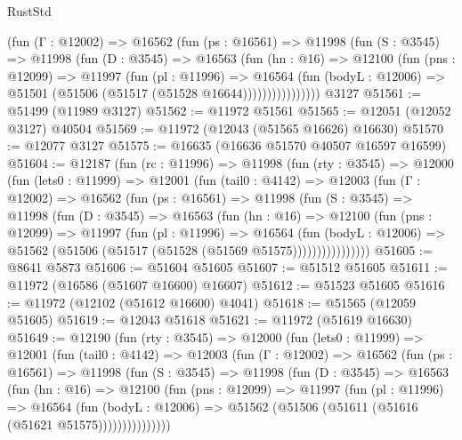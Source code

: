 \begin{lexlean}{RustStd}
\begin{coremodule}
              (fun (Γ : @12002) =>
              @16562
                (fun (ps : @16561) =>
                @11998
                  (fun (S : @3545) =>
                  @11998
                    (fun (D : @3545) =>
                    @16563
                      (fun (hn : @16) =>
                      @12100
                        (fun (pns : @12099) =>
                        @11997
                          (fun (pl : @11996) =>
                          @16564
                            (fun (bodyL : @12006) =>
                            @51501 (@51506 (@51517 (@51528 @16644))))))))))))))))
    @3127
@51561 := @51499 (@11989 @3127)
@51562 := @11972 @51561
@51565 := @12051 (@12052 @3127) @40504
@51569 := @11972 (@12043 (@51565 @16626) @16630)
@51570 := @12077 @3127
@51575 := @16635 (@16636 @51570 @40507 @16597 @16599)
@51604 := @12187
    (fun (rc : @11996) =>
    @11998
      (fun (rty : @3545) =>
      @12000
        (fun (lets0 : @11999) =>
        @12001
          (fun (tail0 : @4142) =>
          @12003
            (fun (Γ : @12002) =>
            @16562
              (fun (ps : @16561) =>
              @11998
                (fun (S : @3545) =>
                @11998
                  (fun (D : @3545) =>
                  @16563
                    (fun (hn : @16) =>
                    @12100
                      (fun (pns : @12099) =>
                      @11997
                        (fun (pl : @11996) =>
                        @16564
                          (fun (bodyL : @12006) =>
                          @51562 (@51506 (@51517 (@51528 (@51569 @51575))))))))))))))))
@51605 := @8641 @5873
@51606 := @51604 @51605
@51607 := @51512 @51605
@51611 := @11972 (@16586 (@51607 @16600) @16607)
@51612 := @51523 @51605
@51616 := @11972 (@12102 (@51612 @16600) @4041)
@51618 := @51565 (@12059 @51605)
@51619 := @12043 @51618
@51621 := @11972 (@51619 @16630)
@51649 := @12190
    (fun (rty : @3545) =>
    @12000
      (fun (lets0 : @11999) =>
      @12001
        (fun (tail0 : @4142) =>
        @12003
          (fun (Γ : @12002) =>
          @16562
            (fun (ps : @16561) =>
            @11998
              (fun (S : @3545) =>
              @11998
                (fun (D : @3545) =>
                @16563
                  (fun (hn : @16) =>
                  @12100
                    (fun (pns : @12099) =>
                    @11997
                      (fun (pl : @11996) =>
                      @16564
                        (fun (bodyL : @12006) =>
                        @51562 (@51506 (@51611 (@51616 (@51621 @51575)))))))))))))))

\end{coremodule}
\end{lexlean}
